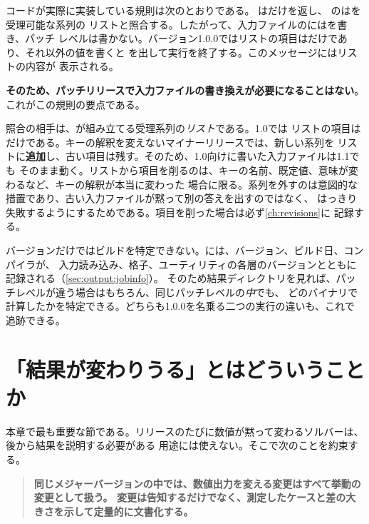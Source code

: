 コードが実際に実装している規則は次のとおりである。
はだけを返し、
のはを受理可能な系列の
リストと照合する。したがって、入力ファイルのにはを書き、パッチ
レベルは書かない。バージョン1.0.0ではリストの項目はだけであり、それ以外の値を書くと
を出して実行を終了する。このメッセージにはリストの内容が
表示される。

\textbf{そのため、パッチリリースで入力ファイルの書き換えが必要になることはない}。これがこの規則の要点である。

\begin{note}[マイナーリリースで古い入力ファイルが動き続ける仕組み]
  照合の相手は、が組み立てる受理系列の\emph{リスト}である。1.0では
  リストの項目はだけである。キーの解釈を変えないマイナーリリースでは、新しい系列を
  リストに\textbf{追加}し、古い項目は残す。そのため、1.0向けに書いた入力ファイルは1.1でも
  そのまま動く。リストから項目を削るのは、キーの名前、既定値、意味が変わるなど、キーの解釈が本当に変わった
  場合に限る。系列を外すのは意図的な措置であり、古い入力ファイルが黙って別の答えを出すのではなく、
  はっきり失敗するようにするためである。項目を削った場合は必ず\cref{ch:revisions}に
  記録する。
\end{note}

バージョンだけではビルドを特定できない。には、バージョン、ビルド日、コンパイラが、
入力読み込み、格子、ユーティリティの各層のバージョンとともに記録される（\cref{sec:output:jobinfo}）。
そのため結果ディレクトリを見れば、パッチレベルが違う場合はもちろん、同じパッチレベルの\emph{中}でも、
どのバイナリで計算したかを特定できる。どちらも1.0.0を名乗る二つの実行の違いも、これで
追跡できる。

\section{「結果が変わりうる」とはどういうことか}
\label{sec:policy:results}

本章で最も重要な節である。リリースのたびに数値が黙って変わるソルバーは、後から結果を説明する必要がある
用途には使えない。そこで次のことを約束する。

\begin{quote}
  \textbf{同じメジャーバージョンの中では、数値出力を変える変更はすべて挙動の変更として扱う。
  変更は告知するだけでなく、測定したケースと差の大きさを示して定量的に文書化する。}
\end{quote}

